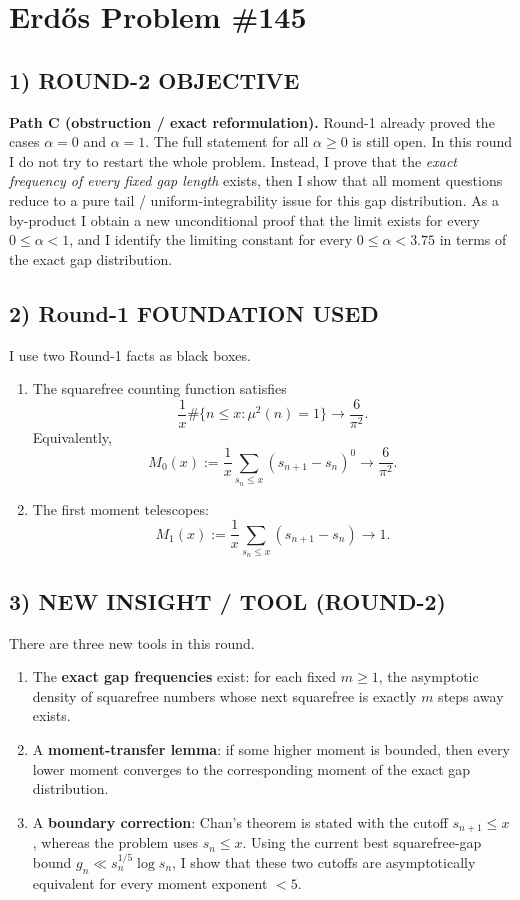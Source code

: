 
\section*{Erd\H{o}s Problem \#145}

\subsection*{1) ROUND-2 OBJECTIVE}

\textbf{Path C (obstruction / exact reformulation).} Round-1 already proved the cases $\alpha=0$ and
$\alpha=1$. The full statement for all $\alpha\ge 0$ is still open. In this round I do not try to restart the
whole problem. Instead, I prove that the \emph{exact frequency of every fixed gap length} exists, then I
show that all moment questions reduce to a pure tail / uniform-integrability issue for this gap
distribution. As a by-product I obtain a new unconditional proof that the limit exists for every
$0\le \alpha<1$, and I identify the limiting constant for every $0\le \alpha<3.75$ in terms of the exact gap
distribution.

\subsection*{2) Round-1 FOUNDATION USED}

I use two Round-1 facts as black boxes.

\begin{enumerate}
\item The squarefree counting function satisfies
\[
\frac{1}{x}\#\{n\le x:\mu^2(n)=1\}\to \frac{6}{\pi^2}.
\]
Equivalently,
\[
M_0(x):=\frac1x\sum_{s_n\le x}(s_{n+1}-s_n)^0 \to \frac{6}{\pi^2}.
\]
\item The first moment telescopes:
\[
M_1(x):=\frac1x\sum_{s_n\le x}(s_{n+1}-s_n)\to 1.
\]
\end{enumerate}

\subsection*{3) NEW INSIGHT / TOOL (ROUND-2)}

There are three new tools in this round.

\begin{enumerate}
\item The \textbf{exact gap frequencies} exist: for each fixed $m\ge 1$, the asymptotic density of
squarefree numbers whose next squarefree is exactly $m$ steps away exists.
\item A \textbf{moment-transfer lemma}: if some higher moment is bounded, then every lower moment
converges to the corresponding moment of the exact gap distribution.
\item A \textbf{boundary correction}: Chan's theorem is stated with the cutoff $s_{n+1}\le x$, whereas the
problem uses $s_n\le x$. Using the current best squarefree-gap bound $g_n\ll s_n^{1/5}\log s_n$, I show
that these two cutoffs are asymptotically equivalent for every moment exponent $<5$.
\end{enumerate}

